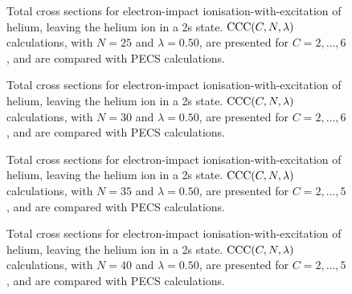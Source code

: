 \documentclass[]{article}
\begin{document}
\begin{figure}[h]
  \begin{center}
    
  \end{center}
  \caption[TICS-with-excitation: $\mathrm{CCC}\lr{C, 25, 0.50}$]{
    Total cross sections for electron-impact ionisation-with-excitation of
    helium, leaving the helium ion in a 2s state.
    $\mathrm{CCC}(C, N, \lambda)$ calculations, with $N = 25$ and
    $\lambda = 0.50$, are presented for $C = 2, \dotsc, 6$, and are compared
    with PECS \cite{PhysRevA.81.022716} calculations.
  }
  \label{fig:cs_tics_ie_n_25}
\end{figure}

\begin{figure}[h]
  \begin{center}
    
  \end{center}
  \caption[TICS-with-excitation: $\mathrm{CCC}\lr{C, 30, 0.50}$]{
    Total cross sections for electron-impact ionisation-with-excitation of
    helium, leaving the helium ion in a 2s state.
    $\mathrm{CCC}(C, N, \lambda)$ calculations, with $N = 30$ and
    $\lambda = 0.50$, are presented for $C = 2, \dotsc, 6$, and are compared
    with PECS \cite{PhysRevA.81.022716} calculations.
  }
  \label{fig:cs_tics_ie_n_30}
\end{figure}

\begin{figure}[h]
  \begin{center}
    
  \end{center}
  \caption[TICS-with-excitation: $\mathrm{CCC}\lr{C, 35, 0.50}$]{
    Total cross sections for electron-impact ionisation-with-excitation of
    helium, leaving the helium ion in a 2s state.
    $\mathrm{CCC}(C, N, \lambda)$ calculations, with $N = 35$ and
    $\lambda = 0.50$, are presented for $C = 2, \dotsc, 5$, and are compared
    with PECS \cite{PhysRevA.81.022716} calculations.
  }
  \label{fig:cs_tics_ie_n_35}
\end{figure}

\begin{figure}[h]
  \begin{center}
    
  \end{center}
  \caption[TICS-with-excitation: $\mathrm{CCC}\lr{C, 40, 0.50}$]{
    Total cross sections for electron-impact ionisation-with-excitation of
    helium, leaving the helium ion in a 2s state.
    $\mathrm{CCC}(C, N, \lambda)$ calculations, with $N = 40$ and
    $\lambda = 0.50$, are presented for $C = 2, \dotsc, 5$, and are compared
    with PECS \cite{PhysRevA.81.022716} calculations.
  }
  \label{fig:cs_tics_ie_n_40}
\end{figure}
\end{document}
